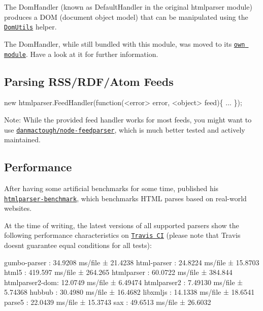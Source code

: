 The {\ttfamily Dom\+Handler} (known as {\ttfamily Default\+Handler} in the original {\ttfamily htmlparser} module) produces a D\+OM (document object model) that can be manipulated using the \href{https://github.com/fb55/DomUtils}{\tt {\ttfamily Dom\+Utils}} helper.

The {\ttfamily Dom\+Handler}, while still bundled with this module, was moved to its \href{https://github.com/fb55/domhandler}{\tt own module}. Have a look at it for further information.

\subsection*{Parsing R\+S\+S/\+R\+D\+F/\+Atom Feeds}


\begin{DoxyCode}
new htmlparser.FeedHandler(function(<error> error, <object> feed)\{
    ...
\});
\end{DoxyCode}


Note\+: While the provided feed handler works for most feeds, you might want to use \href{https://github.com/danmactough/node-feedparser}{\tt danmactough/node-\/feedparser}, which is much better tested and actively maintained.

\subsection*{Performance}

After having some artificial benchmarks for some time, {\bfseries } published his \href{https://github.com/AndreasMadsen/htmlparser-benchmark}{\tt {\ttfamily htmlparser-\/benchmark}}, which benchmarks H\+T\+ML parses based on real-\/world websites.

At the time of writing, the latest versions of all supported parsers show the following performance characteristics on \href{https://travis-ci.org/AndreasMadsen/htmlparser-benchmark/builds/10805007}{\tt Travis CI} (please note that Travis doesn\textquotesingle{}t guarantee equal conditions for all tests)\+:


\begin{DoxyCode}
gumbo-parser   : 34.9208 ms/file ± 21.4238
html-parser    : 24.8224 ms/file ± 15.8703
html5          : 419.597 ms/file ± 264.265
htmlparser     : 60.0722 ms/file ± 384.844
htmlparser2-dom: 12.0749 ms/file ± 6.49474
htmlparser2    : 7.49130 ms/file ± 5.74368
hubbub         : 30.4980 ms/file ± 16.4682
libxmljs       : 14.1338 ms/file ± 18.6541
parse5         : 22.0439 ms/file ± 15.3743
sax            : 49.6513 ms/file ± 26.6032
\end{DoxyCode}


